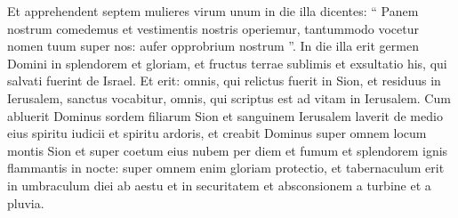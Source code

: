 \begin{biblechapter}
\begin{biblechapter}
\begin{biblechapter}
\begin{biblechapter}
\verse Et apprehendent septem mulieres
 virum unum in die illa dicentes:
 “ Panem nostrum comedemus
 et vestimentis nostris operiemur,
 tantummodo vocetur nomen tuum super nos:
 aufer opprobrium nostrum ”.
 \verse In die illa erit germen Domini in splendorem et gloriam,
 et fructus terrae sublimis et exsultatio
 his, qui salvati fuerint de Israel.
 \verse Et erit: omnis, qui relictus fuerit in Sion,
 et residuus in Ierusalem, sanctus vocabitur,
 omnis, qui scriptus est ad vitam in Ierusalem.
 \verse Cum abluerit Dominus sordem filiarum Sion
 et sanguinem Ierusalem laverit de medio eius
 spiritu iudicii et spiritu ardoris,
 \verse et creabit Dominus super omnem locum montis Sion
 et super coetum eius
 nubem per diem
 et fumum et splendorem ignis flammantis in nocte:
 super omnem enim gloriam protectio,
 \verse et tabernaculum erit in umbraculum diei ab aestu
 et in securitatem et absconsionem a turbine et a pluvia.
 

\end{biblechapter}
\end{biblechapter}
\end{biblechapter}
\end{biblechapter}
